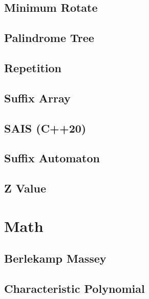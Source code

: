\subsection{Minimum Rotate}

\subsection{Palindrome Tree}

\subsection{Repetition}

\subsection{Suffix Array}

\subsection{SAIS (C++20)}

\subsection{Suffix Automaton}

% 
\subsection{Z Value}


\section{Math}
\subsection{Berlekamp Massey}

%
\subsection{Characteristic Polynomial}

